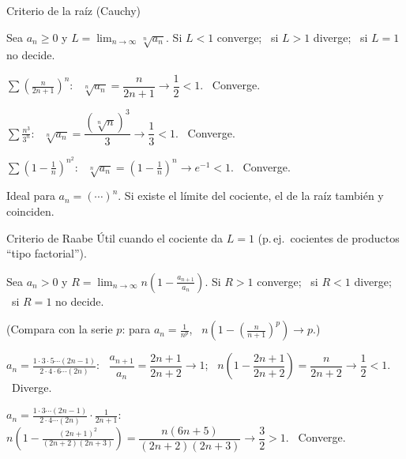\documentclass[10pt,aspectratio=169]{beamer}
\begin{document}
\begin{frame}{Criterio de la raíz (Cauchy)}
  \begin{teorema}
    Sea $a_n\ge0$ y $\displaystyle L=\lim_{n\to\infty}\sqrt[n]{a_n}$.
    \quad Si $L<1$ converge; \ si $L>1$ diverge; \ si $L=1$ no decide.
  \end{teorema}
  \begin{ejemplo}[8]
    $\displaystyle\sum\left(\frac{n}{2n+1}\right)^n$: \ $\sqrt[n]{a_n}=\dfrac{n}{2n+1}\to\dfrac12<1$. \ Converge.
  \end{ejemplo}
  \begin{ejemplo}[9]
    $\displaystyle\sum\frac{n^3}{3^n}$: \ $\sqrt[n]{a_n}=\dfrac{(\sqrt[n]n)^3}{3}\to\dfrac13<1$. \ Converge.
  \end{ejemplo}
  \begin{ejemplo}[10]
    $\displaystyle\sum\left(1-\frac1n\right)^{n^2}$: \ $\sqrt[n]{a_n}=\left(1-\frac1n\right)^n\to e^{-1}<1$. \ Converge.
  \end{ejemplo}
  \small Ideal para $a_n=(\cdots)^n$. Si existe el límite del cociente, el de la raíz también y coinciden.
\end{frame}

\begin{frame}{Criterio de Raabe}
  Útil cuando el cociente da $L=1$ (p.\,ej.\ cocientes de productos ``tipo factorial'').
  \begin{teorema}[Raabe]
    Sea $a_n>0$ y $\displaystyle R=\lim_{n\to\infty}n\left(1-\frac{a_{n+1}}{a_n}\right)$.
    \quad Si $R>1$ converge; \ si $R<1$ diverge; \ si $R=1$ no decide.
  \end{teorema}
  \small (Compara con la serie $p$: para $a_n=\frac1{n^p}$, \ $n\left(1-\left(\frac{n}{n+1}\right)^p\right)\to p$.)
  \normalsize
  \begin{ejemplo}[11]
    $\displaystyle a_n=\frac{1\cdot3\cdot5\cdots(2n-1)}{2\cdot4\cdot6\cdots(2n)}$: \
    $\dfrac{a_{n+1}}{a_n}=\dfrac{2n+1}{2n+2}\to1$; \
    $n\left(1-\dfrac{2n+1}{2n+2}\right)=\dfrac{n}{2n+2}\to\dfrac12<1$. \ Diverge.
  \end{ejemplo}
  \begin{ejemplo}[12]
    $\displaystyle a_n=\frac{1\cdot3\cdots(2n-1)}{2\cdot4\cdots(2n)}\cdot\frac{1}{2n+1}$: \
    $n\left(1-\frac{(2n+1)^2}{(2n+2)(2n+3)}\right)=\dfrac{n(6n+5)}{(2n+2)(2n+3)}\to\dfrac32>1$. \ Converge.
  \end{ejemplo}
\end{frame}
\end{document}
